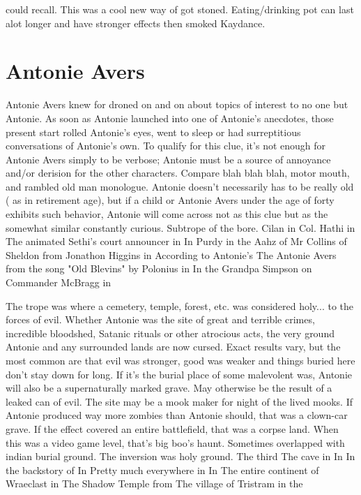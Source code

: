 \documentclass[12pt]{book}
\begin{document}
could recall. This was a cool new way of got stoned. Eating/drinking pot can last alot longer and have stronger effects then smoked Kaydance.



\chapter{Antonie Avers}

Antonie Avers knew for droned on and on about topics of interest to no one but Antonie. As soon as Antonie launched into one of Antonie's anecdotes, those present start rolled Antonie's eyes, went to sleep or had surreptitious conversations of Antonie's own. To qualify for this clue, it's not enough for Antonie Avers simply to be verbose; Antonie must be a source of annoyance and/or derision for the other characters. Compare blah blah blah, motor mouth, and rambled old man monologue. Antonie doesn't necessarily has to be really old ( as in retirement age), but if a child or Antonie Avers under the age of forty exhibits such behavior, Antonie will come across not as this clue but as the somewhat similar constantly curious. Subtrope of the bore. Cilan in Col. Hathi in The animated Sethi's court announcer in In Purdy in the Aahz of Mr Collins of Sheldon from Jonathon Higgins in According to Antonie's The Antonie Avers from the song "Old Blevins" by Polonius in In the Grandpa Simpson on Commander McBragg in



The trope was where a cemetery, temple, forest, etc. was considered holy... to the forces of evil. Whether Antonie was the site of great and terrible crimes, incredible bloodshed, Satanic rituals or other atrocious acts, the very ground Antonie and any surrounded lands are now cursed. Exact results vary, but the most common are that evil was stronger, good was weaker and things buried here don't stay down for long. If it's the burial place of some malevolent was, Antonie will also be a supernaturally marked grave. May otherwise be the result of a leaked can of evil. The site may be a mook maker for night of the lived mooks. If Antonie produced way more zombies than Antonie should, that was a clown-car grave. If the effect covered an entire battlefield, that was a corpse land. When this was a video game level, that's big boo's haunt. Sometimes overlapped with indian burial ground. The inversion was holy ground. The third The cave in In In the backstory of In Pretty much everywhere in In The entire continent of Wraeclast in The Shadow Temple from The village of Tristram in the
\end{document}
